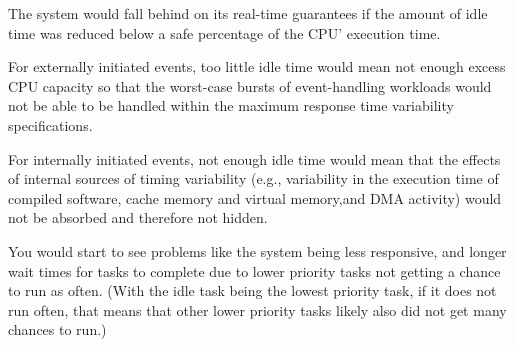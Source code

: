 The system would fall behind on its real-time guarantees if the amount of idle
time was reduced below a safe percentage of the CPU' execution time. 

For externally initiated events, too little idle time would mean not enough
excess CPU capacity so that the worst-case bursts of event-handling workloads
would not be able to be handled within the maximum response time variability
specifications. 

For internally initiated events, not enough idle time would mean that the
effects of internal sources of timing variability (e.g., variability in the
execution time of compiled software, cache memory and virtual memory,and DMA
activity) would not be absorbed and therefore not hidden. 

You would start to see problems like the system being less responsive, and
longer wait times for tasks to complete due to lower priority tasks not getting
a chance to run as often. (With the idle task being the lowest priority task, if
it does not run often, that means that other lower priority tasks likely also
did not get many chances to run.)
